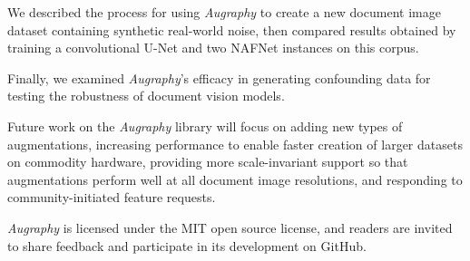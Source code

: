 \documentclass[runningheads]{llncs}
\begin{document}
We described the process for using \emph{Augraphy} to create a new document image dataset containing synthetic real-world noise, then compared results obtained by training a convolutional U-Net and two NAFNet instances on this corpus.

Finally, we examined \emph{Augraphy}'s efficacy in generating confounding data for testing the robustness of document vision models.

Future work on the \emph{Augraphy} library will focus on adding new types of augmentations, increasing performance to enable faster creation of larger datasets on commodity hardware, providing more scale-invariant support so that augmentations perform well at all document image resolutions, and responding to community-initiated feature requests.

\emph{Augraphy} is licensed under the MIT open source license, and readers are invited to share feedback and participate in its development on GitHub.


%
%
%


\end{document}
